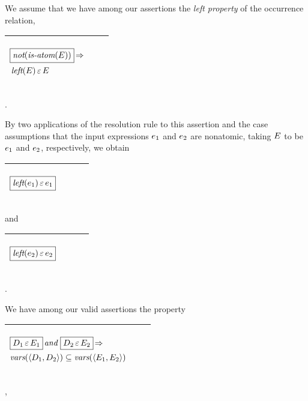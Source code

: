 \documentclass[runningheads]{llncs}
\DeclareMathOperator{\uand}{\emph{and}\,}
\DeclareMathOperator{\unot}{\emph{not}\kern-.0pt}
\DeclareMathOperator{\uimplies}{\Rightarrow}
\DeclareMathOperator{\isatm}{\emph{is-atom}}
\DeclareMathOperator{\lef}{\emph{left}}
\begin{document}
We assume that we have among our assertions
the \emph{left property} of the occurrence relation, 
\begin{center}
  \begin{tabular}{|m{}|m{}||m{}|}
\hline
\begin{center}
$
\begin{aligned}[t]
    &\boxed{\unot(\isatm(E))} \uimplies \\
    & \lef(E) \occursin E
    \end{aligned}
$
\end{center}
& &  \\  \hline
\end{tabular}.
\end{center}
By two applications of the resolution rule to this assertion and the case assumptions that the input expressions $e_{1}$ and $e_{2}$ are nonatomic, taking $E$ to be $e_{1}$ and $e_{2}$, respectively,  we obtain 
\begin{center}
  \begin{tabular}{|m{}|m{}||m{}|}
\hline
\begin{center}
$
\begin{aligned}
    & \boxed{\lef(\e{1}) \occursin \e{1}}
    \end{aligned}
$
\end{center}
& &  \\  \hline
\end{tabular}
\end{center}
\vspace{5pt}
and 
\begin{center}
  \begin{tabular}{|m{}|m{}||m{}|}
\hline
\begin{center}
$
\begin{aligned}
    & \boxed{\lef(\e{2}) \occursin \e{2}}
    \end{aligned}
$
\end{center}
& &  \\  \hline
\end{tabular}.
\end{center}
We have among our valid assertions the property

\vspace{5pt}
\noindent \begin{tabular}{|m{}|m{}||m{}|}
\hline
\begin{center}$
\begin{aligned}
    & \boxed{\varsub{D}{1} \occursin \varsub{E}{1}} \uand 
     \boxed{\varsub{D}{2} \occursin \varsub{E}{2}} \uimplies \\
    & \vars(\langle \varsub{D}{1}, \varsub{D}{2} \rangle) \subseteq
      \vars(\langle \varsub{E}{1}, \varsub{E}{2} \rangle)
    \end{aligned}
$
\end{center}& &  \\  \hline
\end{tabular},
\vspace{10pt}
\end{document}
